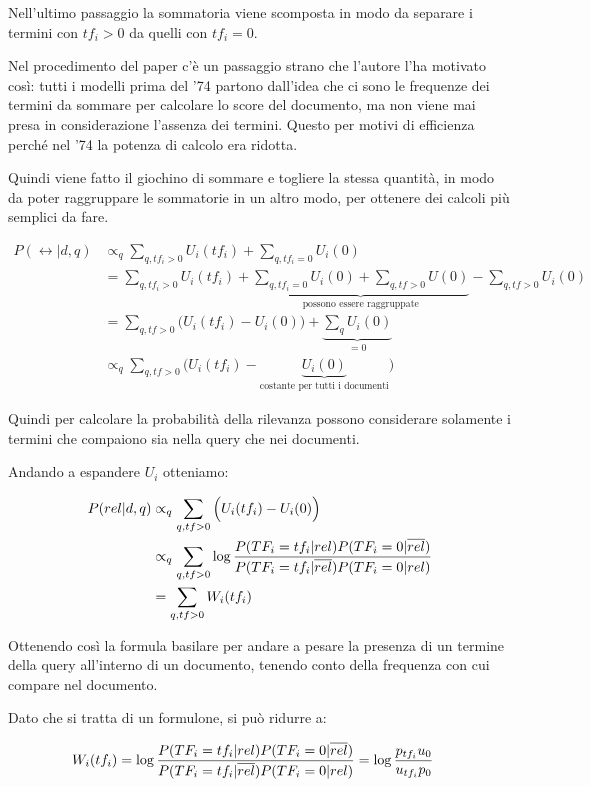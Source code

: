 Nell'ultimo passaggio la sommatoria viene scomposta in modo da separare i termini con $tf_i > 0$ da quelli con $tf_i = 0$.

Nel procedimento del paper c'è un passaggio strano che l'autore l'ha motivato così: tutti i modelli prima del '74 partono dall'idea che ci sono le frequenze dei termini da sommare per calcolare lo score del documento, ma non viene mai presa in considerazione l'assenza dei termini.
Questo per motivi di efficienza perché nel '74 la potenza di calcolo era ridotta.

Quindi viene fatto il giochino di sommare e togliere la stessa quantità, in modo da poter raggruppare le sommatorie in un altro modo, per ottenere dei calcoli più semplici da fare.

\begin{align}
P(\rel | d,q) &\propto_q \sum_{q,tf_i > 0} U_i(tf_i) + \sum_{q,tf_i = 0} U_i(0) \nonumber \\
&= \sum_{q,tf_i > 0} U_i(tf_i) + \underbrace{\sum_{q,tf_i = 0} U_i(0) + \sum_{q, tf > 0} U(0)}_{\text{possono essere raggruppate}} - \sum_{q, tf > 0} U_i(0) \nonumber \\
&= \sum_{q, tf>0} \Big( U_i(tf_i) - U_i(0) \Big) + \underbrace{\sum_q U_i(0)}_{= 0}  \nonumber \\
&\propto_q \sum_{q, tf>0} \Big( U_i(tf_i) - \underbrace{U_i(0)}_{\text{costante per tutti i documenti}} \Big)
\end{align}

Quindi per calcolare la probabilità della rilevanza possono considerare solamente i termini che compaiono sia nella query che nei documenti.

Andando a espandere $U_i$ otteniamo:

\begin{align}
P(rel | d,q) &\propto_q \sum_{q, tf>0} \Big( U_i(tf_i) - U_i(0) \Big) \nonumber \\
&\propto_q \sum_{q, tf>0} \log\frac{ P(TF_i = tf_i | rel) P(TF_i = 0 | \overline{rel}) }{P(TF_i = tf_i | \overline{rel}) P(TF_i = 0 | rel)} \label{eq:basic-prob}\\
&= \sum_{q, tf>0} W_i(tf_i)
\end{align}

Ottenendo così la formula basilare per andare a pesare la presenza di un termine della query all'interno di un documento, tenendo conto della frequenza con cui compare nel documento.

Dato che si tratta di un formulone, si può ridurre a:

\begin{align}
W_i(tf_i) &= \log\frac{ P(TF_i = tf_i | rel) P(TF_i = 0 | \overline{rel}) }{P(TF_i = tf_i | \overline{rel}) P(TF_i = 0 | rel)} = \log \frac{p_{tf_i} u_0}{u_{tf_i} p_0} \label{eq:basic-weight}
\end{align}

